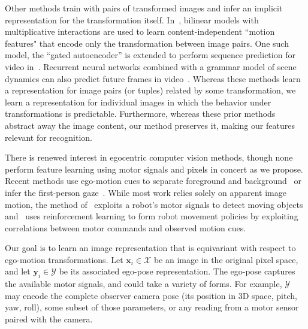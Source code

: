 \documentclass[10pt,twocolumn,letterpaper]{article}
\begin{document}
Other methods train with pairs of transformed images and infer an implicit representation for the transformation itself. In~\cite{Memisevic2013},
%
bilinear models with multiplicative interactions are used to learn content-independent ``motion features" that encode only the transformation between image pairs.
%
One such model, the ``gated autoencoder'' is extended to perform sequence prediction for video in~\cite{Michalski2014}. %
Recurrent neural networks combined  with a grammar model of scene dynamics can also predict future frames in video~\cite{Ranzato2014}.  Whereas these methods learn a representation for image pairs (or tuples) related by some transformation, we learn a representation for individual images in which the behavior under transformations is predictable.  Furthermore, whereas these prior methods abstract away the image content, our method preserves it, making our features relevant for recognition.


There is renewed interest in egocentric computer vision methods, though none perform feature learning using motor signals and pixels in concert as we propose.  Recent methods use ego-motion cues to separate foreground and background~\cite{ren-cvpr2010,xu2012moving} or infer the first-person gaze~\cite{yamada2012attention,li2013iccv}.  While most work relies solely on apparent image motion, the method of~\cite{xu2012moving} exploits a robot's motor signals to detect moving objects and~\cite{nakamura1995motion} uses reinforcement learning to form robot movement policies by exploiting correlations between motor commands and observed motion cues.%

Our goal is to learn an image representation that is equivariant with respect to ego-motion transformations.
Let $\bm{x}_i \in \mathcal{X}$ be an image in the original pixel space, and let $\bm{y}_i \in \mathcal{Y}$ be its associated ego-pose representation.  The ego-pose captures the available motor signals, and could take a variety of forms.  For example, $\mathcal{Y}$ may encode the complete observer camera pose (its position in 3D space, pitch, yaw, roll), some subset of those parameters, or any reading from a motor sensor paired with the camera.
\end{document}
